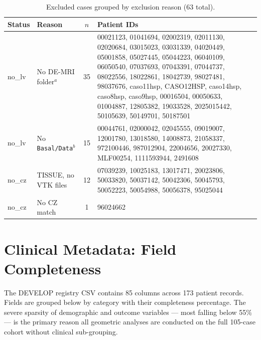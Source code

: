 \begin{table}[htbp]
\centering
\small
\caption{Excluded cases grouped by exclusion reason (63 total).}
\label{tab:excluded}
\begin{tabular}{llcp{8.5cm}}
\toprule
Status & Reason & $n$ & Patient IDs \\
\midrule
no\_lv & No DE-MRI folder$^{a}$ & 35 &
    00021123, 01041694, 02002319, 02011130, 02020684, 03015023, 03031339,
    04020449, 05001858, 05027445, 05044223, 06040109, 06050540, 07037693,
    07043391, 07044737, 08022556, 18022861, 18042739, 98027481, 98037676,
    caso11hsp, CASO12HSP, caso14hsp, caso8hsp, caso9hsp, 00016504, 00050633,
    01004887, 12805382, 19033528, 2025015442, 50105639, 50149701, 50187501 \\
no\_lv & No \texttt{Basal/Data}$^b$ & 15 &
    00044761, 02000042, 02045555, 09019007, 12001780, 13018580, 14008873,
    21058337, 972100446, 987012904, 22004656, 20027330, MLF00254,
    1111593944, 2491608 \\
\midrule
no\_cz & TISSUE, no VTK files & 12 &
    07039239, 10025183, 13017471, 20023806, 50033820, 50037142, 50042306,
    50045793, 50052223, 50054988, 50056378, 95025044 \\
\midrule
no\_cz & No CZ match & 1 & 96024662 \\
\bottomrule
\end{tabular}
\end{table}

\section{Clinical Metadata: Field Completeness}
\label{app:clinicalcsv}

The DEVELOP registry CSV contains 85 columns across 173 patient records. Fields are
grouped below by category with their completeness percentage. The severe sparsity of
demographic and outcome variables --- most falling below 55\% --- is the primary reason
all geometric analyses are conducted on the full 105-case cohort without clinical
sub-grouping.

